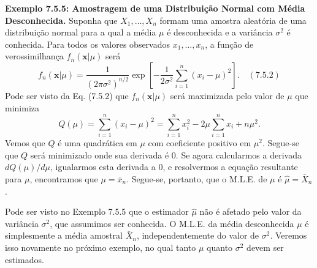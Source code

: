 \textbf{Exemplo 7.5.5: Amostragem de uma Distribuição Normal com Média Desconhecida.} Suponha que $X_1, \dots, X_n$ formam uma amostra aleatória de uma distribuição normal para a qual a média $\mu$ é desconhecida e a variância $\sigma^2$ é conhecida. Para todos os valores observados $x_1, \dots, x_n$, a função de verossimilhança $f_n(\textbf{x}|\mu)$ será
$$f_n(\textbf{x}|\mu) = \frac{1}{(2\pi \sigma^2)^{n/2}} \exp \left[ -\frac{1}{2\sigma^2} \sum_{i=1}^{n} (x_i - \mu)^2 \right]. \quad (7.5.2)$$
Pode ser visto da Eq. (7.5.2) que $f_n(\textbf{x}|\mu)$ será maximizada pelo valor de $\mu$ que minimiza
$$Q(\mu) = \sum_{i=1}^{n} (x_i - \mu)^2 = \sum_{i=1}^{n} x_i^2 - 2\mu \sum_{i=1}^{n} x_i + n\mu^2.$$
Vemos que $Q$ é uma quadrática em $\mu$ com coeficiente positivo em $\mu^2$. Segue-se que $Q$ será minimizado onde sua derivada é 0. Se agora calcularmos a derivada $dQ(\mu)/d\mu$, igualarmos esta derivada a 0, e resolvermos a equação resultante para $\mu$, encontramos que $\mu=\bar{x}_n$. Segue-se, portanto, que o M.L.E. de $\mu$ é $\hat{\mu} = \bar{X}_n$.

\vspace{\baselineskip}

Pode ser visto no Exemplo 7.5.5 que o estimador $\hat{\mu}$ não é afetado pelo valor da variância $\sigma^2$, que assumimos ser conhecida. O M.L.E. da média desconhecida $\mu$ é simplesmente a média amostral $\bar{X}_n$, independentemente do valor de $\sigma^2$. Veremos isso novamente no próximo exemplo, no qual tanto $\mu$ quanto $\sigma^2$ devem ser estimados.

\vspace{\baselineskip}

